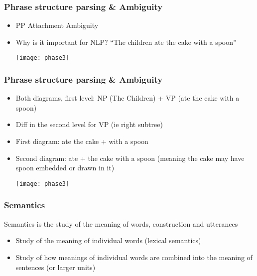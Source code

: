 \begin{frame}[fragile]
  \frametitle{Phrase structure parsing \& Ambiguity}
  \begin{itemize}
  \item PP Attachment Ambiguity
  \item  Why is it important for NLP?
``The children ate the cake with a spoon''
  \begin{center}
\texttt{[image: phase3]}
\end{center}
  \end{itemize}
\end{frame}

\begin{frame}[fragile]
  \frametitle{Phrase structure parsing \& Ambiguity}
  \begin{itemize}
  \item Both diagrams, first level: NP (The Children) + VP (ate the cake with a spoon)
  \item Diff in the second level for VP (ie right subtree)
  \item First diagram:  ate the cake + with a spoon
  \item Second diagram:  ate + the cake with a spoon (meaning the cake may have spoon embedded or drawn in it)
  \begin{center}
\texttt{[image: phase3]}
\end{center}
  \end{itemize}
\end{frame}




\begin{frame}[fragile]
  \frametitle{Semantics}
 Semantics is the study of the meaning of words, construction and utterances
    \begin{itemize}
  \item Study of the meaning of individual words (lexical semantics)
  \item Study of how meanings of individual words are combined into the meaning of sentences (or larger units)
  \end{itemize}
\end{frame}


